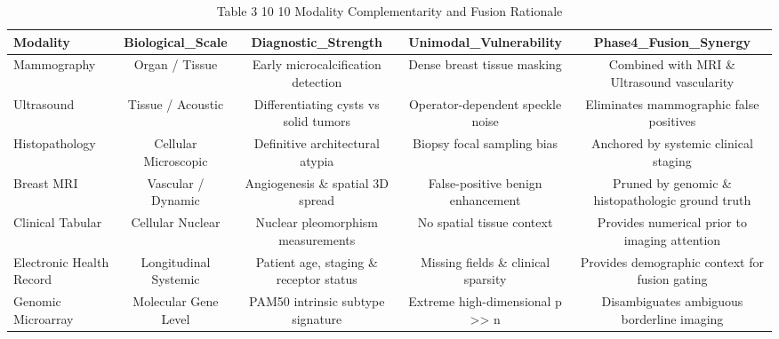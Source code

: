 \begin{table}[htbp]
\centering
\small
\begin{tabular}{lcccc}
\hline
Modality & Biological\_Scale & Diagnostic\_Strength & Unimodal\_Vulnerability & Phase4\_Fusion\_Synergy \\
\hline
Mammography & Organ / Tissue & Early microcalcification detection & Dense breast tissue masking & Combined with MRI \& Ultrasound vascularity \\
Ultrasound & Tissue / Acoustic & Differentiating cysts vs solid tumors & Operator-dependent speckle noise & Eliminates mammographic false positives \\
Histopathology & Cellular Microscopic & Definitive architectural atypia & Biopsy focal sampling bias & Anchored by systemic clinical staging \\
Breast MRI & Vascular / Dynamic & Angiogenesis \& spatial 3D spread & False-positive benign enhancement & Pruned by genomic \& histopathologic ground truth \\
Clinical Tabular & Cellular Nuclear & Nuclear pleomorphism measurements & No spatial tissue context & Provides numerical prior to imaging attention \\
Electronic Health Record & Longitudinal Systemic & Patient age, staging \& receptor status & Missing fields \& clinical sparsity & Provides demographic context for fusion gating \\
Genomic Microarray & Molecular Gene Level & PAM50 intrinsic subtype signature & Extreme high-dimensional p >> n & Disambiguates ambiguous borderline imaging \\
\hline
\end{tabular}
\caption{Table 3 10 10 Modality Complementarity and Fusion Rationale}
\label{tab:table_3_10_10_modality_complementarity_and_fusion_rationale}
\end{table}
